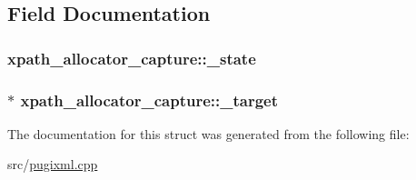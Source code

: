 \subsection{Field Documentation}
\hypertarget{structxpath__allocator__capture_a275859dc99681c12b42ee4f51b713d39}{
\subsubsection[{\_\-state}]{ {\bf xpath\_\-allocator\_\-capture::\_\-state}}}
\label{structxpath__allocator__capture_a275859dc99681c12b42ee4f51b713d39}
\hypertarget{structxpath__allocator__capture_a382acca931c691699ec84a03fb060cf4}{
\subsubsection[{\_\-target}]{$\ast$ {\bf xpath\_\-allocator\_\-capture::\_\-target}}}
\label{structxpath__allocator__capture_a382acca931c691699ec84a03fb060cf4}


The documentation for this struct was generated from the following file:\begin{DoxyCompactItemize}
\item 
src/\hyperlink{pugixml_8cpp}{pugixml.cpp}\end{DoxyCompactItemize}
